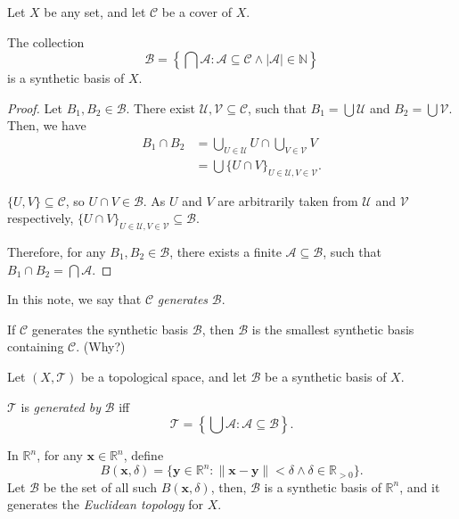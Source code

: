 \documentclass{report}
\begin{document}
\begin{lemma}
	Let $X$ be any set, and let $\mathcal C$ be a cover of $X$.
	
	The collection
	$$
	\mathcal B = \left\{ \bigcap \mathcal A: \mathcal A \subseteq \mathcal C \land |\mathcal A| \in \mathbb N \right\}
	$$
	is a synthetic basis of $X$.
\end{lemma}


\begin{proof}
	Let $B_1, B_2 \in \mathcal B$. There exist $\mathcal U, \mathcal V \subseteq \mathcal C$, such that $B_1 = \bigcup \mathcal U$ and $B_2 = \bigcup \mathcal V$. Then, we have
	$$
	\begin{aligned}
		B_1 \cap B_2 &= \bigcup_{U \in \mathcal U} U \cap \bigcup_{V \in \mathcal V} V \\
		&= \bigcup \{ U \cap V \}_{U \in \mathcal U, V \in \mathcal V}.
	\end{aligned}
	$$
	
	$\{U, V\} \subseteq \mathcal C$, so $U \cap V \in \mathcal B$. As $U$ and $V$ are arbitrarily taken from $\mathcal U$ and $\mathcal V$ respectively, $\{ U \cap V \}_{U \in \mathcal U, V \in \mathcal V} \subseteq \mathcal B$.
	
	Therefore, for any $B_1, B_2 \in \mathcal B$, there exists a finite $\mathcal A \subseteq \mathcal B$, such that $B_1 \cap B_2 = \bigcap \mathcal A$.
\end{proof}


\begin{note}
	In this note, we say that $\mathcal C$ \textit{generates} $\mathcal B$.
\end{note}


\begin{note}
	If $\mathcal C$ generates the synthetic basis $\mathcal B$, then $\mathcal B$ is the smallest synthetic basis containing $\mathcal C$. (Why?)
\end{note}


\begin{definition}
	Let $(X, \mathcal T)$ be a topological space, and let $\mathcal B$ be a synthetic basis of $X$.
	
	$\mathcal T$ is \textit{generated by} $\mathcal B$ iff
	$$
	\mathcal T = \left\{ \bigcup \mathcal A: \mathcal A \subseteq \mathcal B \right\}.
	$$
\end{definition}



\begin{example}
	In $\mathbb R^n$, for any $\mathbf x \in \mathbb R^n$, define
	$$
	B(\mathbf x, \delta) = \{ \mathbf y \in \mathbb R^n : \| \mathbf x - \mathbf y \| < \delta \land \delta \in \mathbb R_{> 0} \}.
	$$
	Let $\mathcal B$ be the set of all such $B(\mathbf x, \delta)$, then, $\mathcal B$ is a synthetic basis of $\mathbb R^n$, and it generates the \textit{Euclidean topology} for $X$.
\end{example}
\end{document}
